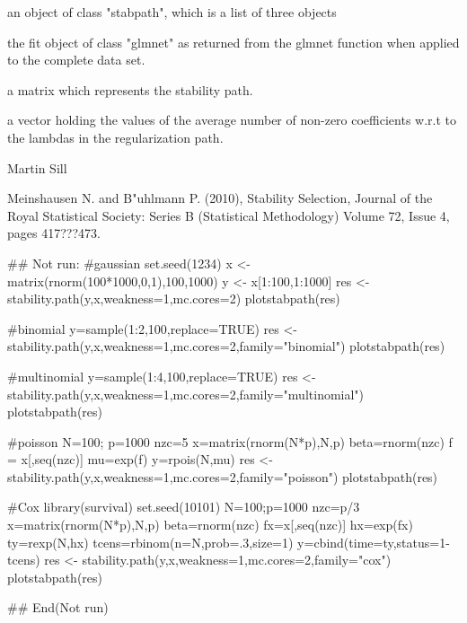 \documentclass[letterpaper]{book}
\begin{document}
\begin{Value}
an object of class "stabpath", which is a list of three objects
\begin{ldescription}
\item[\code{fit}] 
the fit object of class "glmnet" as returned from the glmnet function when applied to the complete data set.

\item[\code{stabpath}] 
a matrix which represents the stability path.

\item[\code{qs}] 
a vector holding the values of the average number of non-zero coefficients w.r.t to the lambdas in the regularization path.

\end{ldescription}
\end{Value}
%
\begin{Author}\relax
Martin Sill 
\end{Author}
%
\begin{References}\relax
Meinshausen N. and B\bsl{}"uhlmann P. (2010), Stability Selection, Journal of the Royal Statistical Society: Series B (Statistical Methodology) Volume 72, Issue 4, pages 417???473.
\end{References}
%
\begin{SeeAlso}\relax
\end{SeeAlso}
%
\begin{Examples}
\begin{ExampleCode}
## Not run: 
#gaussian
set.seed(1234)
x <- matrix(rnorm(100*1000,0,1),100,1000)
y <- x[1:100,1:1000]%
res <- stability.path(y,x,weakness=1,mc.cores=2)
plotstabpath(res)

#binomial
y=sample(1:2,100,replace=TRUE)
res <- stability.path(y,x,weakness=1,mc.cores=2,family="binomial")
plotstabpath(res)
    
#multinomial
y=sample(1:4,100,replace=TRUE)
res <- stability.path(y,x,weakness=1,mc.cores=2,family="multinomial")
plotstabpath(res)
    
#poisson
N=100; p=1000
nzc=5
x=matrix(rnorm(N*p),N,p)
beta=rnorm(nzc)
f = x[,seq(nzc)]%
mu=exp(f)
y=rpois(N,mu)
res <- stability.path(y,x,weakness=1,mc.cores=2,family="poisson")
plotstabpath(res)

#Cox
library(survival)
set.seed(10101)
N=100;p=1000
nzc=p/3
x=matrix(rnorm(N*p),N,p)
beta=rnorm(nzc)
fx=x[,seq(nzc)]%
hx=exp(fx)
ty=rexp(N,hx)
tcens=rbinom(n=N,prob=.3,size=1)
y=cbind(time=ty,status=1-tcens)
res <- stability.path(y,x,weakness=1,mc.cores=2,family="cox")
plotstabpath(res)

## End(Not run)
\end{ExampleCode}
\end{Examples}
\end{document}
